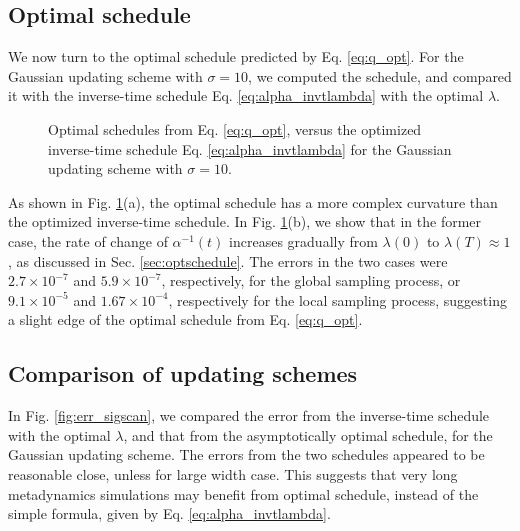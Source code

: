 \documentclass[reprint, floatfix]{revtex4-1}
\begin{document}
\subsection{Optimal schedule}


We now turn to the optimal schedule
predicted by Eq. \eqref{eq:q_opt}.
%
For the Gaussian updating scheme
with $\sigma = 10$,
we computed the schedule,
and compared it with the inverse-time schedule
Eq. \eqref{eq:alpha_invtlambda}
with the optimal $\lambda$.

\begin{figure}[h]
\begin{center}
  \caption{
    \label{fig:optacmp}
    Optimal schedules from Eq. \eqref{eq:q_opt},
    versus the optimized inverse-time schedule
    Eq. \eqref{eq:alpha_invtlambda}
    for the Gaussian updating scheme
    with $\sigma = 10$.
  }
\end{center}
\end{figure}

As shown in Fig. \ref{fig:optacmp}(a),
the optimal schedule has a more complex curvature
than the optimized inverse-time schedule.
%
In Fig. \ref{fig:optacmp}(b),
we show that in the former case,
the rate of change of $\alpha^{-1}(t)$
increases gradually
from $\lambda(0)$ to $\lambda(T) \approx 1$,
as discussed in Sec. \ref{sec:optschedule}.
%
The errors in the two cases were
$2.7 \times 10^{-7}$
and
$5.9 \times 10^{-7}$,
respectively,
for the global sampling process,
%
or
$9.1 \times 10^{-5}$
and
$1.67 \times 10^{-4}$,
respectively
for the local sampling process,
suggesting a slight edge of
the optimal schedule from Eq. \eqref{eq:q_opt}.



\subsection{Comparison of updating schemes}



In Fig. \ref{fig:err_sigscan},
we compared the error from the inverse-time schedule
with the optimal $\lambda$,
and that from the asymptotically optimal schedule,
for the Gaussian updating scheme.
%
The errors from the two schedules appeared to be reasonable close,
unless for large width case.
%
This suggests that very long metadynamics simulations
may benefit from optimal schedule,
instead of the simple formula, given by
Eq. \eqref{eq:alpha_invtlambda}.
\end{document}
